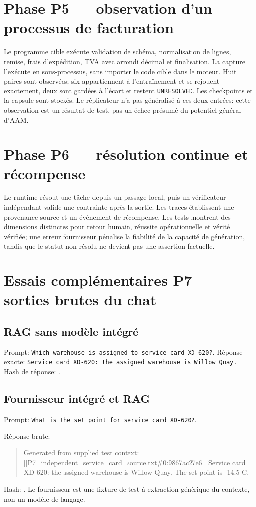 \documentclass[11pt,a4paper]{article}
\begin{document}
\section{Phase P5 — observation d'un processus de facturation}
Le programme cible exécute validation de schéma, normalisation de lignes, remise, frais d'expédition, TVA avec arrondi décimal et finalisation. La capture l'exécute en sous-processus, sans importer le code cible dans le moteur. Huit paires sont observées; six appartiennent à l'entraînement et se rejouent exactement, deux sont gardées à l'écart et restent \texttt{UNRESOLVED}. Les checkpoints et la capsule sont stockés. Le réplicateur n'a pas généralisé à ces deux entrées: cette observation est un résultat de test, pas un échec présumé du potentiel général d'AAM.

\section{Phase P6 — résolution continue et récompense}
Le runtime résout une tâche depuis un passage local, puis un vérificateur indépendant valide une contrainte après la sortie. Les traces établissent une provenance source et un événement de récompense. Les tests montrent des dimensions distinctes pour retour humain, réussite opérationnelle et vérité vérifiée; une erreur fournisseur pénalise la fiabilité de la capacité de génération, tandis que le statut non résolu ne devient pas une assertion factuelle.

\section{Essais complémentaires P7 — sorties brutes du chat}
\subsection{RAG sans modèle intégré}
Prompt: \texttt{Which warehouse is assigned to service card XD-620?}. Réponse exacte: \texttt{Service card XD-620: the assigned warehouse is Willow Quay.} Hash de réponse: .

\subsection{Fournisseur intégré et RAG}
Prompt: \texttt{What is the set point for service card XD-620?}.

Réponse brute:
\begin{quote}\ttfamily\small\raggedright
Generated from supplied test context: [[P7\_independent\_service\_card\_source.txt\#0:9867ac27e6]] Service card XD-620: the assigned warehouse is Willow Quay. The set point is -14.5 C.
\end{quote}
Hash: . Le fournisseur est une fixture de test à extraction générique du contexte, non un modèle de langage.
\end{document}
